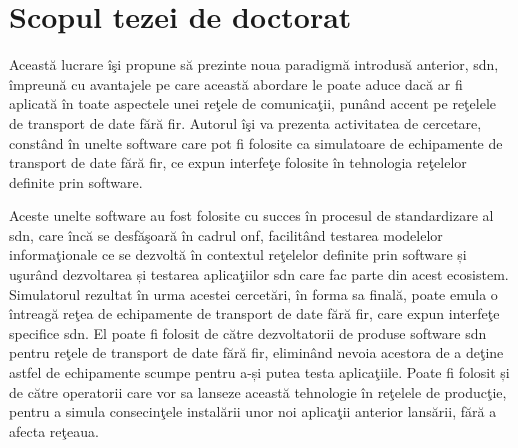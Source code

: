 \section{Scopul tezei de doctorat}

Această lucrare îşi propune să prezinte noua paradigmă introdusă anterior, \gls{sdn}, împreună cu avantajele pe care această abordare le poate aduce dacă ar fi aplicată în toate aspectele unei reţele de comunicaţii, punând accent pe reţelele de transport de date fără fir. Autorul îşi va prezenta activitatea de cercetare, constând în unelte software care pot fi folosite ca simulatoare de echipamente de transport de date fără fir, ce expun interfeţe folosite în tehnologia reţelelor definite prin software.

Aceste unelte software au fost folosite cu succes în procesul de standardizare al \gls{sdn}, care încă se desfăşoară în cadrul \gls{onf}, facilitând testarea modelelor informaţionale ce se dezvoltă în contextul reţelelor definite prin software și uşurând dezvoltarea și testarea aplicaţiilor \gls{sdn} care fac parte din acest ecosistem. Simulatorul rezultat în urma acestei cercetări, în forma sa finală, poate emula o întreagă reţea de echipamente de transport de date fără fir, care expun interfeţe specifice \gls{sdn}. El poate fi folosit de către dezvoltatorii de produse software \gls{sdn} pentru reţele de transport de date fără fir, eliminând nevoia acestora de a deţine astfel de echipamente scumpe pentru a-și putea testa aplicaţiile. Poate fi folosit și de către operatorii care vor sa lanseze această tehnologie în reţelele de producţie, pentru a simula consecinţele instalării unor noi aplicaţii anterior lansării, fără a afecta reţeaua.